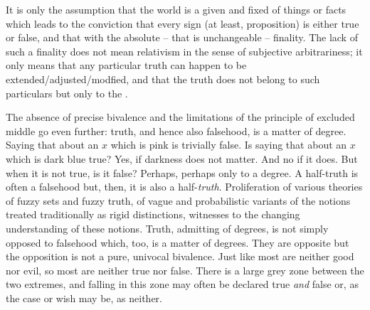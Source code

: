 
\pa\label{pa:fixedTruth} It is only the assumption that the world is a given and
fixed  of things or facts  which leads to the
conviction that every sign (at least, proposition) is either true or false, and
that with the absolute -- that is unchangeable -- finality. The lack of such a
finality does not mean relativism in the sense of subjective arbitrariness; it
only means that any particular truth can happen to be extended/adjusted/modfied,
and that the  truth does not belong to such particulars but only to
the .  

The absence of precise bivalence and the limitations of the principle of
excluded middle go even further: truth, and hence also falsehood, is a matter of
degree.  Saying that  about an $x$ which is pink is trivially
false.  Is saying that  about an $x$ which is dark blue true?
Yes, if darkness does not matter. And no if it does. But when it is not true, is
it false? Perhaps, perhaps only to a degree.  A half-truth is often a falsehood
but, then, it is also a half-{\em truth}.  Proliferation of various theories of
fuzzy sets and fuzzy truth, of vague and probabilistic variants of the notions
treated traditionally as rigid distinctions, witnesses to the changing
understanding of these notions.  Truth, admitting of degrees, is not simply
opposed to falsehood which, too, is a matter of degrees. They are opposite but
the opposition is not a pure, univocal bivalence. Just like most  are
neither good nor evil, so most  are neither true nor false.
There is a large grey zone between the two extremes, and  falling in
this zone may often be declared true {\em and} false or, as the case or wish may
be, as neither.

